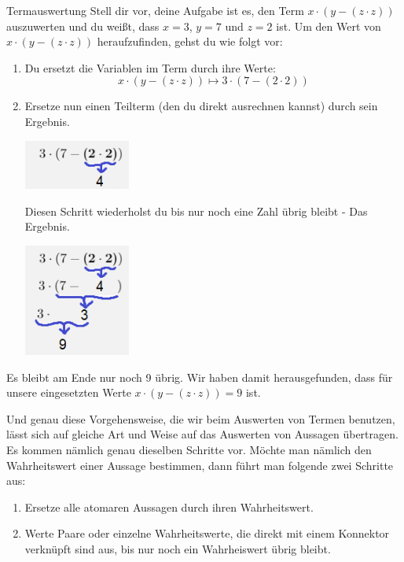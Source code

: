 \documentclass[../../main.tex]{subfiles}
\begin{document}
\begin{example}{Termauswertung}
Stell dir vor, deine Aufgabe ist es, den Term $x \cdot (y - (z \cdot z))$ auszuwerten
 und du weißt, dass $x = 3$, $y = 7$ und  $z = 2$ ist.
Um den Wert von $x \cdot (y - (z \cdot z))$ heraufzufinden, gehst
du wie folgt vor:
\begin{enumerate}
    \item Du ersetzt die Variablen im Term durch ihre Werte:
    \[x \cdot (y - (z \cdot z)) \longmapsto 3 \cdot (7 - (2 \cdot 2)) \]
    
    \item Ersetze nun einen Teilterm (den du direkt ausrechnen kannst) durch 
    sein Ergebnis.
    
    \begin{center}
        \includegraphics[width=0.275\textwidth]{images/TEMP_termalg_schritt_1.png}
    \end{center}

    Diesen Schritt wiederholst du bis nur noch eine Zahl übrig bleibt - Das Ergebnis.

    \begin{center}
        \includegraphics[width=0.275\textwidth]{images/TEMP_termalg.png}
    \end{center}
\end{enumerate}
    Es bleibt am Ende nur noch 9 übrig. Wir haben damit herausgefunden, 
    dass für unsere eingesetzten Werte $x \cdot (y - (z \cdot z)) = 9$ ist.

\end{example}

Und genau diese Vorgehensweise, die wir beim Auswerten von Termen benutzen, 
lässt sich auf gleiche Art und Weise auf das Auswerten von Aussagen übertragen. 
Es kommen nämlich genau dieselben Schritte vor. Möchte man nämlich den Wahrheitswert einer Aussage bestimmen, dann führt man folgende zwei Schritte aus:
    \begin{enumerate}
    \item Ersetze alle atomaren Aussagen durch ihren Wahrheitswert.
    \item Werte Paare oder einzelne Wahrheitswerte, die direkt mit einem Konnektor
        verknüpft sind aus, bis nur noch ein Wahrheiswert übrig bleibt.
    \end{enumerate}
    
\end{document}

